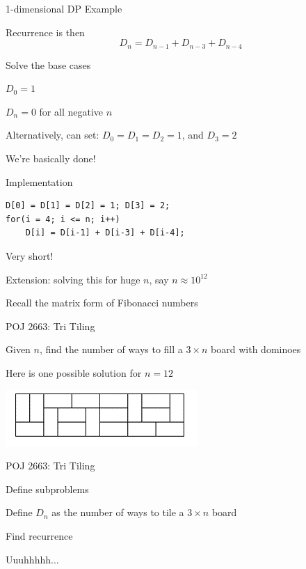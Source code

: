 \documentclass[13pt,onlymath]{beamer}
\begin{document}
\begin{frame}{1-dimensional DP Example}
\BIT
\item Recurrence is then
\[
D_n = D_{n-1} + D_{n-3} + D_{n-4}
\]
\item Solve the base cases
\BIT
\item $D_0 = 1$
\item $D_n = 0$ for all negative $n$
\item Alternatively, can set: $D_0 = D_1 = D_2 = 1$, and $D_3 = 2$
\EIT
\vfill
\item We're basically done!
\EIT
\end{frame}

\begin{frame}[fragile]{Implementation}
\begin{Verbatim}[xleftmargin=25pt]
D[0] = D[1] = D[2] = 1; D[3] = 2;
for(i = 4; i <= n; i++)
    D[i] = D[i-1] + D[i-3] + D[i-4];
\end{Verbatim}
\BIT
\item Very short!
\item Extension: solving this for huge $n$, say $n \approx 10^{12}$
\BIT
\item Recall the matrix form of Fibonacci numbers
\EIT
\EIT
\end{frame}

\begin{frame}{POJ 2663: Tri Tiling}
\BIT
\item Given $n$, find the number of ways to fill a $3 \times n$ board with dominoes
\vfill
\item Here is one possible solution for $n=12$
\begin{center}
\includegraphics[height=0.3\textheight]{figures/tritiling.png}
\end{center}
\EIT
\end{frame}

\begin{frame}{POJ 2663: Tri Tiling}
\BIT
\item Define subproblems
\BIT
\item Define $D_n$ as the number of ways to tile a $3 \times n$ board
\EIT
\vfill
\item Find recurrence
\BIT
\item Uuuhhhhh...
\EIT
\EIT
\end{frame}
\end{document}
